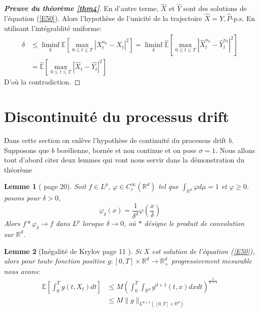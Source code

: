\documentclass[A4paper,12pt]{report}
\newtheorem{lemma}{Lemme}[chapter]
\newcommand{\R}{{\mathbb{R}}}
\newcommand{\E}{{\mathbb{E}}}
\begin{document}
\begin{proof}[\textbf{Preuve du théorème \ref{thm4}}]
En d'autre terme, $\widehat{X}$ et $\widehat{Y}$ sont des solutions de l'équation (\ref{E50}). Alors l'hypothèse de l'unicité de la trajectoire $\widehat{X}=\widehat{Y}, \widehat{P}$-p.s.
En utilisant l'intégrablité uniforme:
$$
\begin{aligned}
\delta & \leq \liminf _{k} \E\left[\max _{0 \leq t \leq T}\left|X_{t}^{n_{k}}-X_{t}\right|^{2}\right]=\liminf _{k} \widehat{\E}\left[\max _{0 \leq t \leq T}\left|\widehat{X}_{t}^{n_{k}}-\widehat{Y}_{t}^{n_{k}}\right|^{2}\right] \\
& =\widehat{\E}\left[\max _{0 \leq t \leq T}\left|\widehat{X}_{t}-\widehat{Y_{t}}\right|^{2}\right]
\end{aligned}
$$
D'où la contradiction.
\end{proof}
\section{Discontinuité du processus drift}
Dans cette section on enlève l'hypothèse de continuité du processus drift $b$.
Supposons que $b$ borélienne, bornée et non continue et on pose $\sigma =1$.
Nous allons tout d'abord citer deux lemmes qui vont  nous servir dans la démonstration du théorème
\begin{lemma}[\cite{MERKER} page 20] 
Soit $f \in L^p$, $\varphi \in C_c^{\infty}(\R^d)$ tel que $\int_{\R^d} \varphi d \mu =1 $ et $\varphi \geq 0$. posons pour $\delta > 0$, $$\varphi_{\delta} (x) = \frac{1}{\delta^d} \varphi(\frac{x}{\delta})$$
Alors $f*\varphi_{\delta} \rightarrow f$ dans $L^p$ lorsque $\delta \rightarrow 0$, où $*$ désigne le produit de convolution sur $\R^d$.

\end{lemma}\label{lem6}
\begin{lemma}[Inégalité de Krylov \cite{Cavallazzi} page 11 ] 
Si $X$ est solution de l'équation (\ref{E50}), alors pour toute fonction positive  $g : [0, T] \times \R^d \longrightarrow \R^d _{+} $ progressivement mesurable nous avons:
\begin{align*}
\E \left[\int_0 ^T g(t,X_t)dt \right] & \leq M \left( \int_0^T \int_{\R^d} g^{d+1}(t,x)dx dt \right)^{\frac{1}{d+1}} \\
&\leq M \parallel g \parallel_{L^{d+1} ([0, T]\times \R^d)}
\end{align*} 
\end{lemma}\label{lem7}
\end{document}
